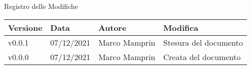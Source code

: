 \begin{center}
    \huge{Registro delle Modifiche}
  \end{center}
  
  \begin{center}
    \begin{tabular}{|p{2cm}|p{2cm}|p{3cm}|p{5cm}|}
      \hline
      \textbf{Versione} & \textbf{Data} & \textbf{Autore} & \textbf{Modifica}                    \\ \hline
      v0.0.1            & 07/12/2021    & Marco Mamprin   & Stesura del documento \\ \hline
      v0.0.0            & 07/12/2021    & Marco Mamprin   & Creata del documento \\ \hline
    \end{tabular}
  \end{center}